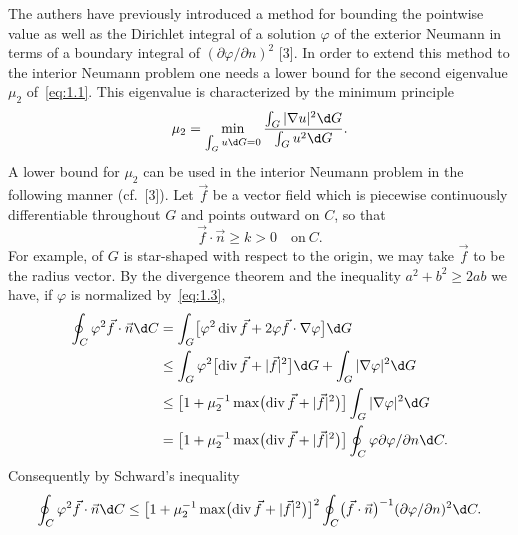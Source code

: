 \documentclass{article}
\theoremstyle{remarks}
\renewcommand{\div}{\operatorname{div}}
\begin{document}
The authers have previously introduced a method for bounding the pointwise
value as well as the Dirichlet integral of a solution $\varphi$ of the exterior
Neumann in terms of a boundary integral of $(\partial\varphi/\partial n)^2$ [3].
In order to extend this method to the interior Neumann problem one needs
a lower bound for the second eigenvalue $\mu_2$ of~\eqref{eq:1.1}.
This eigenvalue is characterized by the minimum principle
\begin{equation}\label{eq:1.4}
  \mu_2 = \min_{\int_G u\d G=0} \frac{\int_G |\nabla u|^2 \d G}{\int_G u^2 \d G}.
\end{equation}
A lower bound for $\mu_2$ can be used in the interior Neumann problem
in the following manner (cf.~[3]).
Let $\vec{f}$ be a vector field which is piecewise continuously differentiable
throughout $G$ and points outward on $C$, so that
\begin{equation}\label{eq:1.5}
  \vec{f}\cdot\vec{n} \geq k > 0 \quad \text{on}\ C.
\end{equation}
For example, of $G$ is star-shaped with respect to the origin, we may take $\vec{f}$
to be the radius vector. By the divergence theorem and the inequality $a^2+b^2\geq 2ab$
we have, if $\varphi$ is normalized by~\eqref{eq:1.3},
\begin{equation}\label{eq:1.6}
  \begin{aligned}
    \oint_C \varphi^2 \vec{f}\cdot\vec{n} \d C
    & = \int_G \bigl[\varphi^2\div\vec{f} + 2\varphi \vec{f}\cdot\nabla\varphi\bigr] \d G \\
    & \leq \int_G \varphi^2 \bigl[\div\vec{f} + |\vec{f}|^2\bigr] \d G
        + \int_G |\nabla\varphi|^2 \d G \\
    & \leq \bigl[1+\mu_2^{-1}\max\bigl(\div\vec{f} + |\vec{f}|^2\bigr)\bigr]
        \int_G |\nabla\varphi|^2 \d G \\
    & = \bigl[1+\mu_2^{-1}\max\bigl(\div\vec{f}+|\vec{f}|^2\bigr)\bigr]
        \oint_C \varphi \partial\varphi/\partial n \d C.
  \end{aligned}
\end{equation}
Consequently by Schward's inequality
\begin{equation}\label{eq:1.7}
  \oint_C \varphi^2 \vec{f}\cdot\vec{n} \d C
  \leq \bigl[1 + \mu_2^{-1} \max\bigl(\div\vec{f} + |\vec{f}|^2\bigr)\bigr]^2
  \oint_C \bigl(\vec{f}\cdot\vec{n}\bigr)^{-1} (\partial\varphi/\partial n)^2 \d C.
\end{equation}
\end{document}
